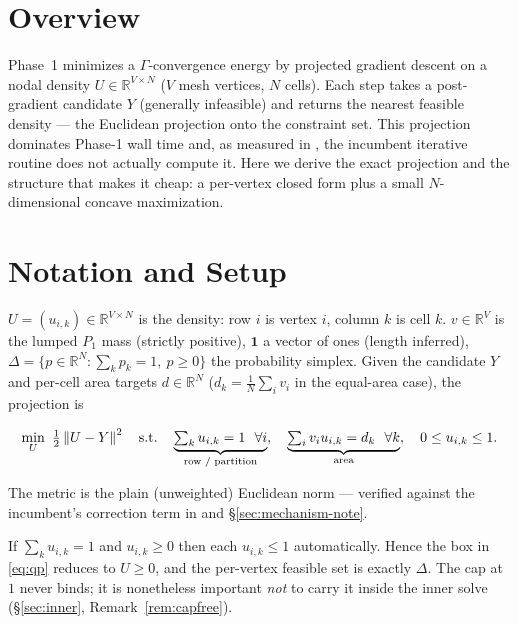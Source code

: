 \documentclass[11pt,a4paper]{article}
\begin{document}
\tableofcontents
\newpage

\section{Overview}
\label{sec:overview}
Phase~1 minimizes a $\Gamma$-convergence energy by projected gradient descent on a nodal
density $U\in\mathbb{R}^{V\times N}$ ($V$ mesh vertices, $N$ cells). Each step takes a
post-gradient candidate $Y$ (generally infeasible) and returns the nearest feasible density
--- the Euclidean projection onto the constraint set. This projection dominates Phase-1 wall
time and, as measured in , the
incumbent iterative routine does not actually compute it. Here we derive the exact
projection and the structure that makes it cheap: a per-vertex closed form plus a small
$N$-dimensional concave maximization.

\section{Notation and Setup}
\label{sec:setup}
$U=(u_{i,k})\in\mathbb{R}^{V\times N}$ is the density: row $i$ is vertex $i$, column $k$ is
cell $k$. $v\in\mathbb{R}^V$ is the lumped $P_1$ mass (strictly positive), $\mathbf 1$ a
vector of ones (length inferred), $\Delta=\{p\in\mathbb{R}^N: \sum_k p_k=1,\ p\ge0\}$ the
probability simplex. Given the candidate $Y$ and per-cell area targets $d\in\mathbb{R}^N$
($d_k=\tfrac1N\sum_i v_i$ in the equal-area case), the projection is

\begin{equation}
  \min_{U}\ \tfrac12\left\|U-Y\right\|^2
  \quad\text{s.t.}\quad
  \underbrace{\textstyle\sum_k u_{i,k}=1\ \ \forall i}_{\text{row / partition}},\quad
  \underbrace{\textstyle\sum_i v_i u_{i,k}=d_k\ \ \forall k}_{\text{area}},\quad
  0\le u_{i,k}\le 1 .
  \label{eq:qp}
\end{equation}

The metric is the plain (unweighted) Euclidean norm --- verified against the incumbent's
correction term in  and \S\ref{sec:mechanism-note}.

\begin{remark}
\label{rem:cap}
If $\sum_k u_{i,k}=1$ and $u_{i,k}\ge0$ then each $u_{i,k}\le1$ automatically. Hence the
box in \eqref{eq:qp} reduces to $U\ge0$, and the per-vertex feasible set is exactly $\Delta$.
The cap at $1$ never binds; it is nonetheless important \emph{not} to carry it inside the
inner solve (\S\ref{sec:inner}, Remark~\ref{rem:capfree}).
\end{remark}
\end{document}
